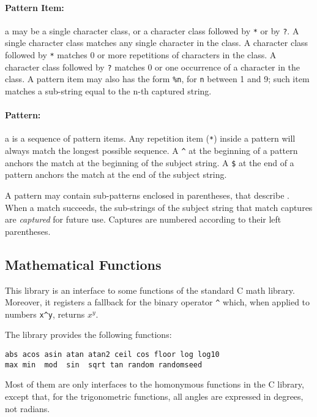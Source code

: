 \paragraph{Pattern Item:}
a  may be a single character class,
or a character class followed by \verb'*' or by \verb'?'.
A single character class matches any single character in the class.
A character class followed by \verb'*' matches 0 or more repetitions
of characters in the class.
A character class followed by \verb'?' matches 0 or one occurrence
of a character in the class.
A pattern item may also has the form \verb'%n',
for \verb-n- between 1 and 9;
such item matches a sub-string equal to the n-th captured string.

\paragraph{Pattern:}
a  is a sequence of pattern items.
Any repetition item (\verb'*') inside a pattern will always
match the longest possible sequence.
A \verb'^' at the beginning of a pattern anchors the match at the
beginning of the subject string.
A \verb'$' at the end of a pattern anchors the match at the
end of the subject string.

A pattern may contain sub-patterns enclosed in parentheses,
that describe .
When a match succeeds, the sub-strings of the subject string
that match captures are {\em captured} for future use.
Captures are numbered according to their left parentheses.

\subsection{Mathematical Functions} \label{mathlib}

This library is an interface to some functions of the standard C math library.
Moreover, it registers a fallback for the binary operator \verb'^' which,
when applied to numbers \verb'x^y', returns $x^y$.

The library provides the following functions:
\begin{verbatim}
abs acos asin atan atan2 ceil cos floor log log10
max min  mod  sin  sqrt tan random randomseed
\end{verbatim}
Most of them
are only interfaces to the homonymous functions in the C library,
except that, for the trigonometric functions,
all angles are expressed in degrees, not radians.

